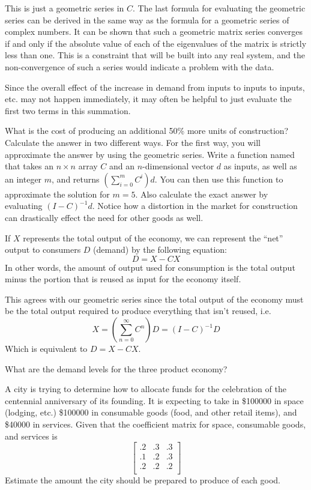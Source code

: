 This is just a geometric series in $C$.
The last formula for evaluating the geometric series can be derived in the same way as the formula for a geometric series of complex numbers.
It can be shown that such a geometric matrix series converges if and only if the absolute value of each of the eigenvalues of the matrix is strictly less than one.
This is a constraint that will be built into any real system, and the non-convergence of such a series would indicate a problem with the data.

Since the overall effect of the increase in demand from inputs to inputs to inputs, etc. may not happen immediately, it may often be helpful to just evaluate the first two terms in this summation.

\begin{problem}
What is the cost of producing an additional 50\% more units of construction?
Calculate the answer in two different ways. 
For the first way, you will approximate the answer by using the geometric series.
Write a function named  that takes an $n \times n$ array $C$ and an $n$-dimensional 
vector $d$ as inputs, as well as an integer $m$, and returns $(\sum_{i=0}^m C^i)d$.
You can then use this function to approximate the solution for $m=5$.
Also calculate the exact answer by evaluating $(I-C)^{-1}d$. 
Notice how a distortion in the market for construction can drastically effect the need for other goods as well.
\end{problem}

If $X$ represents the total output of the economy, we can represent the ``net'' output to consumers $D$ (demand) by the following equation:
\[ D = X - C X \]
In other words, the amount of output used for consumption is the total output minus the portion that is reused as input for the economy itself.

This agrees with our geometric series since the total output of the economy must be the total output required to produce everything that isn't reused, i.e.
\[ X = \left( \sum_{n=0}^{\infty} C^n \right) D = \left( I - C \right)^{-1} D \]
Which is equivalent to $ D = X - C X $.

\begin{problem}
What are the demand levels for the three product economy?
\end{problem}

\begin{problem}
A city is trying to determine how to allocate funds for the celebration of the centennial anniversary of its founding.
It is expecting to take in \$100000 in space (lodging, etc.) \$100000 in consumable goods (food, and other retail items), and \$40000 in services.
Given that the coefficient matrix for space, consumable goods, and services is
\[ \begin{bmatrix}
.2 & .3 & .3 \\
.1 & .2 & .3 \\
.2 & .2 & .2 \\
\end{bmatrix} \]
Estimate the amount the city should be prepared to produce of each good.
\end{problem}

